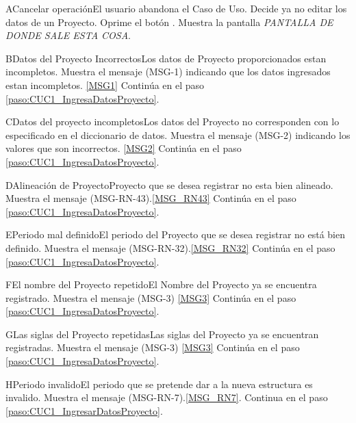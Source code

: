 	\begin{UCtrayectoriaA}{A}{Cancelar operación}{El usuario abandona el Caso de Uso.}
			\UCpaso[\UCactor] Decide ya no editar los datos de un Proyecto.
			\UCpaso[\UCactor] Oprime el botón .
			\UCpaso Muestra la pantalla \textit{PANTALLA DE DONDE SALE ESTA COSA}.
	\end{UCtrayectoriaA}


	\begin{UCtrayectoriaA}{B}{Datos del Proyecto Incorrectos}{Los datos de Proyecto proporcionados estan incompletos.}
			\UCpaso Muestra el mensaje (MSG-1) indicando que los datos ingresados estan incompletos. \ref{MSG1}
			\UCpaso Continúa en el paso \ref{paso:CUC1_IngresaDatosProyecto}.
	\end{UCtrayectoriaA}

	\begin{UCtrayectoriaA}{C}{Datos del proyecto incompletos}{Los datos del Proyecto no corresponden con lo especificado en el diccionario de datos.}
			\UCpaso Muestra el mensaje (MSG-2) indicando los valores que son incorrectos. \ref{MSG2}
			\UCpaso Continúa en el paso \ref{paso:CUC1_IngresaDatosProyecto}.
	\end{UCtrayectoriaA}

	\begin{UCtrayectoriaA}{D}{Alineación de Proyecto}{Proyecto que se desea registrar no esta bien alineado.}
			\UCpaso Muestra el mensaje (MSG-RN-43).\ref{MSG_RN43}
			\UCpaso Continúa en el paso \ref{paso:CUC1_IngresaDatosProyecto}.
	\end{UCtrayectoriaA}

	\begin{UCtrayectoriaA}{E}{Periodo mal definido}{El periodo del Proyecto que se desea registrar no está bien definido.}
			\UCpaso Muestra el mensaje (MSG-RN-32).\ref{MSG_RN32}
			\UCpaso Continúa en el paso \ref{paso:CUC1_IngresaDatosProyecto}.
	\end{UCtrayectoriaA}


	\begin{UCtrayectoriaA}{F}{El nombre del Proyecto repetido}{El Nombre del Proyecto ya se encuentra registrado.}
			\UCpaso Muestra el mensaje (MSG-3) \ref{MSG3}
			\UCpaso Continúa en el paso \ref{paso:CUC1_IngresaDatosProyecto}.
	\end{UCtrayectoriaA}
	\begin{UCtrayectoriaA}{G}{Las siglas del Proyecto repetidas}{Las siglas del Proyecto ya se encuentran registradas.}
			\UCpaso Muestra el mensaje (MSG-3) \ref{MSG3}
			\UCpaso Continúa en el paso \ref{paso:CUC1_IngresaDatosProyecto}.
	\end{UCtrayectoriaA}

	\begin{UCtrayectoriaA}{H}{Periodo invalido}{El periodo que se pretende dar a la nueva estructura es invalido.}
		\UCpaso Muestra el mensaje (MSG-RN-7).\ref{MSG_RN7}.
		\UCpaso Continua en el paso \ref{paso:CUC1_IngresarDatosProyecto}.
	\end{UCtrayectoriaA}




